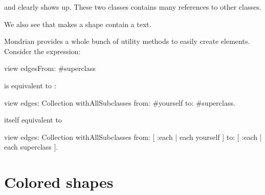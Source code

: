 \documentclass[a4paper,10pt,twoside]{book}
\begin{document}
 and  clearly shows up. These two classes contains many references to other classes.

We also see that  makes a shape contain a text.

Mondrian provides a whole bunch of utility methods to easily create elements.  Consider the expression:
\begin{code}{}
view edgesFrom: #superclass
\end{code}

 is equivalent to  :

\begin{code}{}
view edges: Collection withAllSubclasses from: #yourself to: #superclass.
\end{code}

itself equivalent to
\begin{code}{}
view 
  edges: Collection withAllSubclasses 
  from: [ :each | each yourself ] 
  to: [ :each | each superclass ].
\end{code}

%


%
%

\section{Colored shapes}
\end{document}
